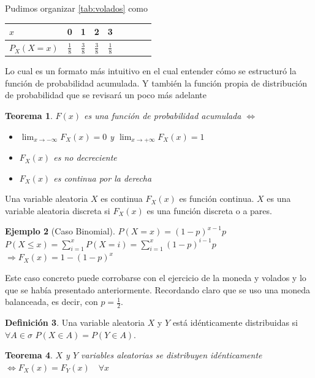 \documentclass[11pt,a4paper,oneside]{report}
\theoremstyle{definition}
\newtheorem{definicion}{Definición}[chapter]
\newtheorem{ejemplo}[definicion]{Ejemplo}
\theoremstyle{plain}
\newtheorem{teorema}[definicion]{Teorema}
\theoremstyle{remark}
\begin{document}
Pudimos organizar \cref{tab:volados} como 

\begin{table}[H]
  \centering
  \begin{tabular}{@{}lcccccccc@{}}
    \toprule
    $x$ & 0 & 1 & 2 & 3 \\
    \midrule
    $P_X(X=x)$ & $\frac{1}{8}$ & $\frac{3}{8}$ & $\frac{3}{8}$ & $\frac{1}{8}$\\
    \bottomrule
  \end{tabular}
\end{table}

Lo cual es un formato más intuitivo en el cual entender cómo se estructuró la función de probabilidad acumulada.
Y también la función propia de distribución de probabilidad que se revisará un poco más adelante
\begin{teorema}
  $F(x)$ es una función de probabilidad acumulada $\iff$
  \begin{itemize}
    \item $\lim_{x \to - \infty }F_{X}(x)=0$ y $\lim_{x \to + \infty }F_{X}(x)=1$
    \item $F_{X}(x)$ es no decreciente
    \item $F_{X}(x)$ es continua por la derecha
  \end{itemize}
\end{teorema}

Una variable aleatoria $X$ es continua $F_X(x)$ es función continua. $X$ es una variable aleatoria discreta si 
$F_X(x)$ es una función discreta o a pares.

\begin{ejemplo}[Caso Binomial]
  $P(X=x)=(1-p)^{x-1}p$\\
  $P(X\leq x)=\sum_{i=1}^{x}P(X=i)=\sum_{i=1}^{x}(1-p)^{i-1}p$
  $\Rightarrow F_X(x)=1-(1-p)^{x}$
\end{ejemplo}
Este caso concreto puede corrobarse con el ejercicio de la moneda y volados y lo que se había presentado
anteriormente. Recordando claro que se uso una moneda balanceada, es decir, con $p=\frac{1}{2}$.

\begin{definicion}
  Una variable aleatoria $X$ y $Y$ está idénticamente distribuidas si $\forall A \in \sigma$
  $P(X\in A)=P(Y\in A)$.
\end{definicion}

\begin{teorema}
  $X$ y $Y$ variables aleatorias se distribuyen idénticamente $\iff F_X(x)=F_Y(x) \quad \forall x$ 
\end{teorema}
\end{document}
